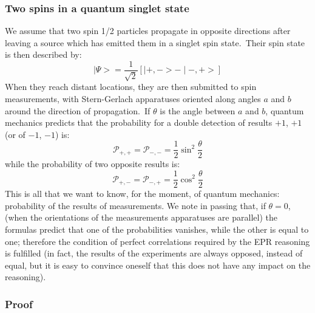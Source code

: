 \documentclass[12pt,onecolumn]{article}%
\begin{document}
\subsubsection{Two spins in a quantum singlet state}

We assume that two spin 1/2 particles propagate in opposite directions after
leaving a source which has emitted them in a singlet spin state.\ Their spin
state is then described by:%
\begin{equation}
\mid\Psi>=\frac{1}{\sqrt{2}}\left[  \mid+,->-\mid-,+>\right]  \label{0}%
\end{equation}
When they reach distant locations, they are then submitted to spin
measurements, with Stern-Gerlach apparatuses oriented along angles $a$ and $b$
around the direction of propagation.\ If $\theta$ is the angle between $a$ and
$b$, quantum mechanics predicts that the probability for a double detection of
results $+1$, $+1$ (or of $-1$, $-1$) is:
\begin{equation}
\mathcal{P}_{+,+}=\mathcal{P}_{-,-}=\frac{1}{2}\sin^{2}\frac{\theta}{2}
\label{1}%
\end{equation}
while the probability of two opposite results is:
\begin{equation}
\mathcal{P}_{+,-}=\mathcal{P}_{-,+}=\frac{1}{2}\cos^{2}\frac{\theta}{2}
\label{2}%
\end{equation}
This is all that we want to know, for the moment, of quantum mechanics:
probability of the results of measurements. We note in passing that, if
$\theta=0$, (when the orientations of the measurements apparatuses are
parallel) the formulas predict that one of the probabilities vanishes, while
the other is equal to one; therefore the condition of perfect correlations
required by the EPR reasoning is fulfilled (in fact, the results of the
experiments are always opposed, instead of equal, but it is easy to convince
oneself that this does not have any impact on the reasoning).

\subsubsection{Proof}

\label{proof}
\end{document}
